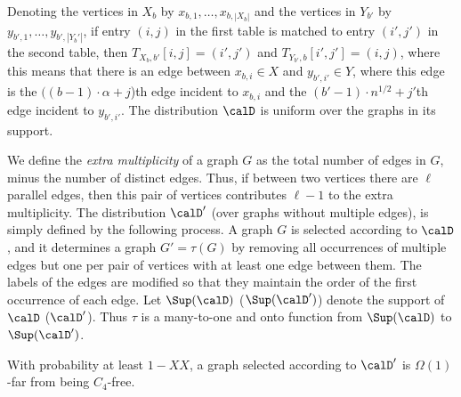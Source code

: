 Denoting the vertices in $X_b$ by $x_{b,1},\dots,x_{b,|X_b|}$ and the vertices in $Y_{b'}$ by $y_{b',1},\dots,y_{b',|Y_b'|}$,
if entry $(i,j)$ in the first table is matched to entry $(i',j')$ in the second table, then
$T_{X_b,b'}[i,j] = (i',j')$ and $T_{Y_{b'},b}[i',j'] = (i,j)$, where
this means that there is an edge between $x_{b,i}\in X$ and $y_{b',i'}\in Y$, where this edge is the $((b-1)\cdot\alpha+j$)th edge incident to $x_{b,i}$ and the $(b'-1)\cdot n^{1/2}+j'$th edge incident to $y_{b',i'}$.
The distribution $\calD$ is uniform over the graphs in its support.

We define the \emph{extra multiplicity} of a graph $G$ as the total number of edges in $G$, minus the number of distinct edges. Thus, if between two vertices there are $\ell$ parallel edges, then this pair of vertices contributes $\ell-1$ to the extra multiplicity.
The distribution $\calD'$ (over graphs without multiple edges), is simply defined by the following process.
A graph $G$ is selected according to $\calD$, and it determines a graph $G' = \tau(G)$ by removing all occurrences of multiple edges but one per pair of vertices with at least one edge between them. The labels of the edges are modified so that they maintain the order of the first occurrence of each edge. 
Let $\Sup(\calD)$ ($\Sup(\calD')$) denote the support of $\calD$ ($\calD'$).  Thus $\tau$ is a many-to-one and onto function from $\Sup(\calD)$ to $\Sup(\calD')$.


\begin{claim}\label{clm:D-C4-far}
With probability at least $1-XX$, a graph selected according to $\calD'$ is $\Omega(1)$-far from being $C_4$-free.
\end{claim}


